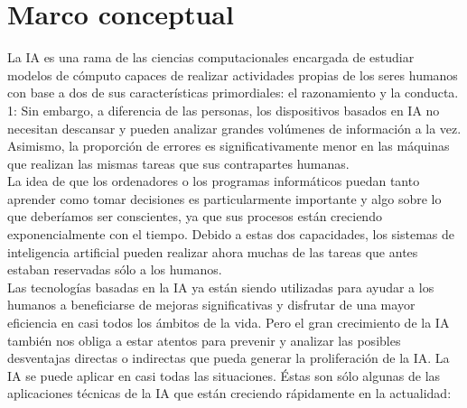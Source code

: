 \clearpage
\section{Marco conceptual}
    La IA es una rama de las ciencias computacionales encargada de estudiar modelos de cómputo capaces de realizar actividades propias de los seres humanos con base a dos de sus características primordiales: el razonamiento y la conducta. 1: Sin embargo, a diferencia de las personas, los dispositivos basados en IA no necesitan descansar y pueden analizar grandes volúmenes de información a la vez. Asimismo, la proporción de errores es significativamente menor en las máquinas que realizan las mismas tareas que sus contrapartes humanas.\\
    \newline
    La idea de que los ordenadores o los programas informáticos puedan tanto aprender como tomar decisiones es particularmente importante y algo sobre lo que deberíamos ser conscientes, ya que sus procesos están creciendo exponencialmente con el tiempo. Debido a estas dos capacidades, los sistemas de inteligencia artificial pueden realizar ahora muchas de las tareas que antes estaban reservadas sólo a los humanos. \\
    \newline
    Las tecnologías basadas en la IA ya están siendo utilizadas para ayudar a los humanos a beneficiarse de mejoras significativas y disfrutar de una mayor eficiencia en casi todos los ámbitos de la vida. Pero el gran crecimiento de la IA también nos obliga a estar atentos para prevenir y analizar las posibles desventajas directas o indirectas que pueda generar la proliferación de la IA. La IA se puede aplicar en casi todas las situaciones. Éstas son sólo algunas de las aplicaciones técnicas de la IA que están creciendo rápidamente en la actualidad:
